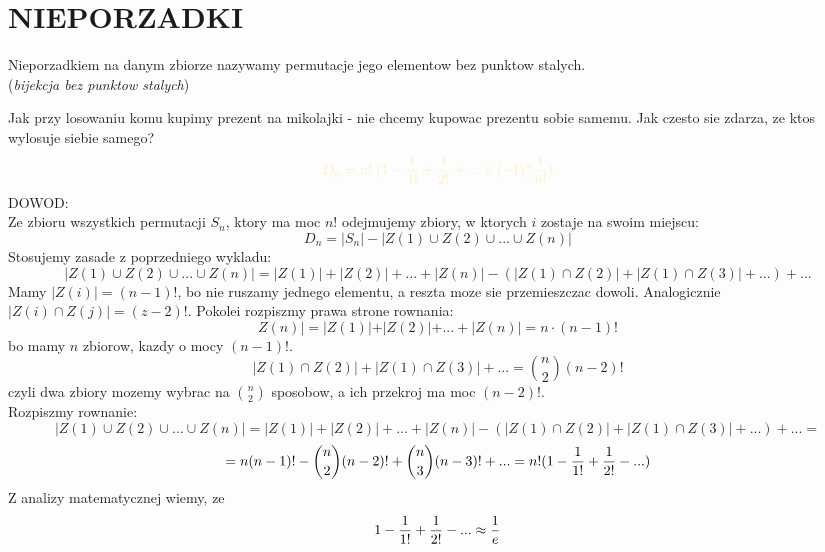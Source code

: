 \documentclass{article}
\begin{document}
\pagecolor{back}\color{txt}\ttfamily
\section*{NIEPORZADKI}
    \begin{center}
        Nieporzadkiem na danym zbiorze nazywamy \color{def}permutacje jego elementow bez punktow stalych\color{txt}.\smallskip\\
        (\emph{bijekcja bez punktow stalych})
    \end{center}
    Jak przy losowaniu komu kupimy prezent na mikolajki - nie chcemy kupowac prezentu sobie samemu. Jak czesto sie zdarza, ze ktos wylosuje siebie samego?
    $$\color{acc}D_n=n!\;(1-\frac1{1!}+\frac1{2!}+...+(-1)^n\frac1{n!})$$
    \color{emp}DOWOD\color{txt}:\medskip\\
    Ze zbioru wszystkich permutacji $S_n$, ktory ma moc $n!$ odejmujemy zbiory, w ktorych $i$ zostaje na swoim miejscu:
    $$D_n=|S_n|-|Z(1)\cup Z(2)\cup...\cup Z(n)|$$
    Stosujemy zasade z poprzedniego wykladu:
    $$|Z(1)\cup Z(2)\cup...\cup Z(n)|=|Z(1)|+|Z(2)|+...+|Z(n)|-(|Z(1)\cap Z(2)|+|Z(1)\cap Z(3)|+...)+...$$
    Mamy $|Z(i)|=(n-1)!$, bo nie ruszamy jednego elementu, a reszta moze sie przemieszczac dowoli. Analogicznie $|Z(i)\cap Z(j)|=(z-2)!$. Pokolei rozpiszmy prawa strone rownania:
    $$Z(n)|=|Z(1)|+|Z(2)|+...+|Z(n)| = n\cdot(n-1)!$$
    bo mamy $n$ zbiorow, kazdy o mocy $(n-1)!$.
    $$|Z(1)\cap Z(2)|+|Z(1)\cap Z(3)|+...={n\choose2}(n-2)!$$
    czyli dwa zbiory mozemy wybrac na ${n\choose2}$ sposobow, a ich przekroj ma moc $(n-2)!$.\\
    Rozpiszmy rownanie:
    $$|Z(1)\cup Z(2)\cup...\cup Z(n)|=|Z(1)|+|Z(2)|+...+|Z(n)|-(|Z(1)\cap Z(2)|+|Z(1)\cap Z(3)|+...)+...=$$
    $$=n(n-1)!-{n\choose2}(n-2)!+{n\choose3}(n-3)!+...=n!(1-{1\over1!}+{1\over2!}-...)$$
    Z analizy matematycznej wiemy, ze
    $$1-{1\over1!}+{1\over2!}-...\approx{1\over e}$$
\end{document}
